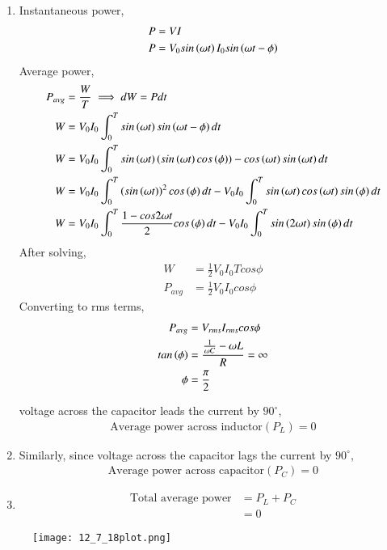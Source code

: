 \documentclass[a4,12pt,onecolumn]{IEEEtran}
\begin{document}
\begin{enumerate}
    \item Instantaneous power,
    \begin{align}
        P &= VI \\
        P &= V_0sin\left(\omega t\right) I_0 sin\left(\omega t - \phi\right)
    \end{align}
    Average power,
    \begin{align}
    P_{avg} &= \frac{W}{T} \implies dW = Pdt \\
    W &= V_0 I_0 \int_{0}^{T} sin\left(\omega t\right) sin\left(\omega t - \phi\right) dt \\
     W &= V_0 I_0 \int_{0}^{T} sin\left(\omega t\right)\left(sin\left(\omega t\right)cos\left(\phi\right)\right) - cos\left(\omega t\right)sin\left(\omega t\right) dt\\
       W &= V_0 I_0 \int_{0}^{T} \left(sin\left(\omega t\right)\right)^2 cos\left(\phi\right)dt - V_0 I_0\int_{0}^{T}sin\left(\omega t\right)cos\left(\omega t\right)sin\left(\phi\right) dt\\
        W &= V_0 I_0 \int_{0}^{T} \frac{1-cos{2 \omega t}}{2} cos\left(\phi\right)dt - V_0 I_0\int_{0}^{T}sin\left(2 \omega t\right)sin\left(\phi\right)dt
    \end{align}
After solving,
    \begin{align}
        W &= \frac{1}{2} V_0 I_0 T cos{\phi} \\
        P_{avg} &=\frac{1}{2} V_0 I_0 cos{\phi}
    \end{align}
    Converting to rms terms,
    \begin{align}
      P_{avg} &= V_{rms} I_{rms} cos{\phi} \\
      tan\left(\phi\right) &= \frac{\frac{1}{\omega C} -\omega L}{R} = \infty\\
      \phi &= \frac{\pi}{2} 
    \end{align}

 voltage across the capacitor leads the current by $90^\circ$,
    \begin{align}
        \text{Average power across inductor} (P_L) = 0
    \end{align}

    \item 
    Similarly, since voltage across the capacitor lags the current by $90^\circ$,
    \begin{align}
        \text{Average power across capacitor} (P_C) = 0
    \end{align}

    \item 
    \begin{align}
        \text{Total average power} &= P_L + P_C \\
        &= 0
    \end{align}
\end{enumerate}

\begin{figure}[ht]
\centering
   \texttt{[image: 12\_7\_18plot.png]}
   \label{fig:12_7_18}
 \end{figure}
\end{document}
